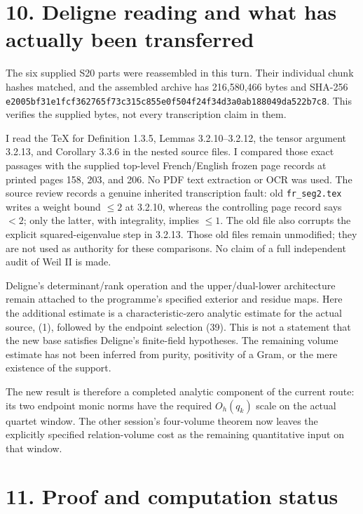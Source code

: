 \section{10. Deligne reading and what has actually been
transferred}\label{GraphV2:deligne-reading-and-what-has-actually-been-transferred}

The six supplied S20 parts were reassembled in this turn. Their
individual chunk hashes matched, and the assembled archive has
216,580,466 bytes and SHA-256
\nolinkurl{e2005bf31e1fcf362765f73c315c855e0f504f24f34d3a0ab188049da522b7c8}.
This verifies the supplied bytes, not every transcription claim in them.

I read the TeX for Definition 1.3.5, Lemmas 3.2.10--3.2.12, the tensor
argument 3.2.13, and Corollary 3.3.6 in the nested source files. I
compared those exact passages with the supplied top-level French/English
frozen page records at printed pages 158, 203, and 206. No PDF text
extraction or OCR was used. The source review records a genuine
inherited transcription fault: old \texttt{fr\_seg2.tex} writes a weight
bound \(\le2\) at 3.2.10, whereas the controlling page record says
\(<2\); only the latter, with integrality, implies \(\le1\). The old
file also corrupts the explicit squared-eigenvalue step in 3.2.13. Those
old files remain unmodified; they are not used as authority for these
comparisons. No claim of a full independent audit of Weil II is made.

Deligne's determinant/rank operation and the upper/dual-lower
architecture remain attached to the programme's specified exterior and
residue maps. Here the additional estimate is a characteristic-zero
analytic estimate for the actual source, (1), followed by the endpoint
selection (39). This is not a statement that the new base satisfies
Deligne's finite-field hypotheses. The remaining volume estimate has not
been inferred from purity, positivity of a Gram, or the mere existence
of the support.

The new result is therefore a completed analytic component of the
current route: its two endpoint monic norms have the required
\(O_h(q_k)\) scale on the actual quartet window. The other session's
four-volume theorem now leaves the explicitly specified relation-volume
cost as the remaining quantitative input on that window.

\section{11. Proof and computation
status}\label{GraphV2:proof-and-computation-status}

